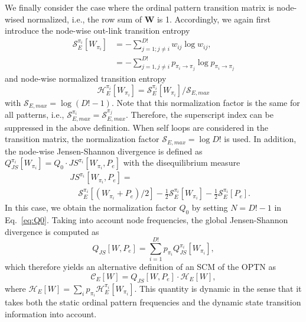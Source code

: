 \documentclass[aip,cha,reprint,nofootinbib]{revtex4-1}
\begin{document}
We finally consider the case where the ordinal pattern transition matrix is node-wised normalized, i.e., the row sum of $\mathbf{W}$ is 1. Accordingly, we again first introduce the node-wise out-link transition entropy
\begin{equation}
\begin{split}
\mathcal{S}_{E}^{\pi_i}[W_{\pi_i}] &= - \sum_{j = 1; j \neq i}^{D!} w_{ij} \log w_{ij},  \\ 
&= - \sum_{j=1, j \neq i}^{D!} p_{\pi_i \to \pi_j} \log p_{\pi_i \to \pi_j} 
\end{split}
\end{equation}
and node-wise normalized transition entropy
\begin{equation}
\mathcal{H}_{E}^{\pi_i}[W_{\pi_i}] = \mathcal{S}_{E}^{\pi_i}[W_{\pi_i}] / \mathcal{S}_{E, max} 
\end{equation}
with $\mathcal{S}_{E, max} = \log (D! - 1)$. Note that this normalization factor is the same for all patterns, i.e., $\mathcal{S}_{E, max}^{\pi_i} = \mathcal{S}_{E, max}^{\pi_j}$. Therefore, the superscript index can be suppressed in the above definition. {\color{red}When self loops are considered in the transition matrix, the normalization factor $\mathcal{S}_{E, max} = \log D! $ is used.} In addition, the node-wise Jensen-Shannon divergence is defined as $Q_{JS}^{\pi_i}[W_{\pi_i}] = Q_0 \cdot JS^{\pi_i} [W_{\pi_i}, P_e]$ with the disequilibrium measure
\begin{eqnarray}
&&JS^{\pi_i} [W_{\pi_i}, P_e] = \nonumber \\
&&\quad \mathcal{S}_{E}^{\pi_i}[(W_{\pi_i} + P_e)/2] - \frac{1}{2}\mathcal{S}_{E}^{\pi_i}[W_{\pi_i}] - \frac{1}{2}\mathcal{S}_{E}^{\pi_i}[P_e]. 
\end{eqnarray}
In this case, we obtain the normalization factor $Q_0$ by setting $N = D! - 1$ in Eq.~\eqref{eq:Q0}. Taking into account node frequencies, the global Jensen-Shannon divergence is computed as 
\begin{equation}
Q_{JS}[W, P_e] = \sum_{i=1}^{D!} p_{\pi_i} Q_{JS}^{\pi_i}[W_{\pi_i}], 
\end{equation}
which therefore yields an alternative definition of an SCM of the OPTN as 
\begin{equation}
\mathcal{C}_{E}[W] = Q_{JS}[W, P_e] \cdot \mathcal{H}_{E}[W], 
\end{equation}
where $\mathcal{H}_{E}[W] = \sum_{i} p_{\pi_i} \mathcal{H}_{E}^{\pi_i}[W_{\pi_i}]$. This quantity is dynamic in the sense that it takes both the static ordinal pattern frequencies and the dynamic state transition information into account. 
\end{document}
